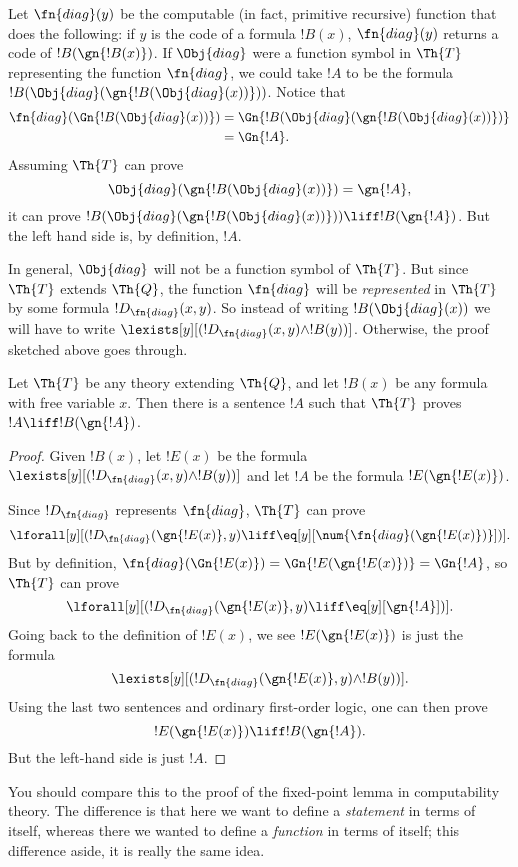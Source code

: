 \documentclass[../../include/open-logic-section]{subfiles}
\begin{document}


Let $\fn{diag}(y)$ be the computable (in fact, primitive recursive)
function that does the following: if $y$ is the code of a formula
$!B(x)$, $\fn{diag}(y)$ returns a code of $!B(\gn{!B(x)})$. If
$\Obj{diag}$ were a function symbol in $\Th{T}$ representing the
function $\fn{diag}$, we could take $!A$ to be the formula
$!B(\Obj{diag}(\gn{!B(\Obj{diag}(x))}))$. Notice that
\begin{align*}
\fn{diag}(\Gn{!B(\Obj{diag}(x))}) & = 
\Gn{!B(\Obj{diag}(\gn{!B(\Obj{diag}(x))})} \\
& = \Gn{!A}.
\end{align*}
Assuming $\Th{T}$ can prove
\[
\Obj{diag}(\gn{!B(\Obj{diag}(x))}) = \gn{!A},
\]
it can prove $!B(\Obj{diag}(\gn{!B(\Obj{diag}(x))}))
\liff !B(\gn{!A})$. But the left hand side is, by
definition, $!A$.

In general, $\Obj{diag}$ will not be a function symbol of
$\Th{T}$. But since $\Th{T}$ extends $\Th{Q}$, the function
$\fn{diag}$ will be {\em represented} in $\Th{T}$ by some formula
$!D_{\fn{diag}}(x,y)$. So instead of writing $!B(\Obj{diag}(x))$ we
will have to write $\lexists[y][(!D_{\fn{diag}}(x,y) \land
  !B(y))]$. Otherwise, the proof sketched above goes through.

\begin{lem}
  Let $\Th{T}$ be any theory extending $\Th{Q}$, and let $!B(x)$ be any
  formula with free variable $x$. Then there is a sentence $!A$ such
  that $\Th{T}$ proves $!A \liff !B(\gn{!A})$.
\end{lem}


\begin{proof}
Given $!B(x)$, let $!E(x)$ be the formula
$\lexists[y][(!D_{\fn{diag}}(x,y) \land !B(y))]$ and let $!A$ be the
formula $!E(\gn{!E(x)})$.

Since $!D_{\fn{diag}}$ represents $\fn{diag}$, $\Th{T}$ can prove
\[
\lforall[y][(!D_{\fn{diag}}(\gn{!E(x)},y) \liff
  \eq[y][\num{\fn{diag}(\gn{!E(x)})}])].
\]
But by definition, 
$\fn{diag}(\Gn{!E(x)}) = \Gn{!E(\gn{!E(x)})} =
\Gn{!A}$, so $\Th{T}$ can prove
\[
\lforall[y][(!D_{\fn{diag}}(\gn{!E(x)},y) \liff \eq[y][\gn{!A}])].
\]
Going back to the definition of $!E(x)$, we see
$!E(\gn{!E(x)})$ is just the formula
\[
\lexists[y][(!D_{\fn{diag}}(\gn{!E(x)},y) \land !B(y))].
\]
Using the last two sentences and ordinary first-order logic, one can
then prove
\[
!E(\gn{!E(x)}) \liff !B(\gn{!A}).
\]
But the left-hand side is just $!A$. 
\end{proof}

\begin{digress}
You should compare this to the proof of the fixed-point lemma in
computability theory. The difference is that here we want to define a
{\em statement} in terms of itself, whereas there we wanted to define
a {\em function} in terms of itself; this difference aside, it is
really the same idea.
\end{digress}
\end{document}

